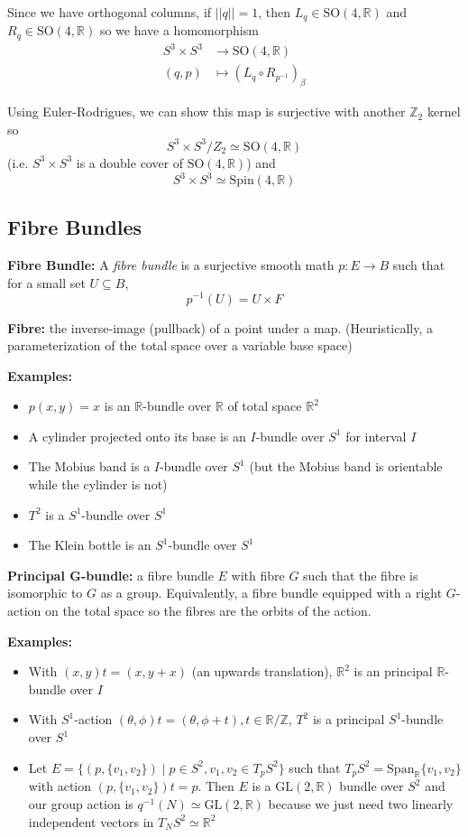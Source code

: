\documentclass[12pt]{article}
\newcommand{\R}{\mathbb{R}}
\newcommand{\Z}{\mathbb{Z}}
\newcommand{\norm}[1]{\left\vert \left\vert #1 \right\vert \right\vert}
\newcommand{\SO}{\text{SO}}
\newcommand{\GL}{\text{GL}}
\begin{document}
Since we have orthogonal columns, if $\norm{q} = 1$, then $L_q \in \SO(4, \R)$ and $R_q \in \SO(4, \R)$ so we have a homomorphism
\begin{align*}
    S^3 \times S^3 &\to \SO(4, \R)\\ 
    (q, p) &\mapsto (L_q \circ R_{p^{-1}})_{\beta}
\end{align*}

Using Euler-Rodrigues, we can show this map is surjective with another $\Z_2$ kernel so 
\[S^3 \times S^3/Z_2 \simeq \SO(4, \R)\]
(i.e. $S^3 \times S^3$ is a double cover of $\SO(4, \R)$)
and 
\[S^3 \times S^3 \simeq \text{Spin}(4, \R)\]

\subsection*{Fibre Bundles}
\textbf{Fibre Bundle:} A \emph{fibre bundle} is a surjective smooth math $p: E \to B$ such that for a small set $U \subseteq B$, 
\[p^{-1}(U) = U \times F\]

\textbf{Fibre:} the inverse-image (pullback) of a point under a map. (Heuristically, a parameterization of the total space over a variable base space)

\textbf{Examples:}
\begin{itemize}
    \item $p(x, y) = x$ is an $\R$-bundle over $\R$ of total space $\R^2$ 
    \item A cylinder projected onto its base is an $I$-bundle over $S^1$ for interval $I$
    \item The Mobius band is a $I$-bundle over $S^1$ (but the Mobius band is orientable while the cylinder is not)
    \item $T^2$ is a $S^1$-bundle over $S^1$
    \item The Klein bottle is an $S^1$-bundle over $S^1$
\end{itemize}

\textbf{Principal G-bundle:} a fibre bundle $E$ with fibre $G$ such that the fibre is isomorphic to $G$ as a group. Equivalently, a fibre bundle equipped with a right $G$-action on the total space so the fibres are the orbits of the action.

\textbf{Examples:}
\begin{itemize}
    \item With $(x, y)t = (x, y + x)$ (an upwards translation), $\R^2$ is an principal $\R$-bundle over $I$ 
    \item With $S^1$-action $(\theta, \phi)t = (\theta, \phi + t), t\in \R/\Z$, $T^2$ is a principal $S^1$-bundle over $S^1$ 
    \item Let $E = \{(p, \{v_1, v_2\}) \; | \; p\in S^2, v_1, v_2 \in T_pS^2\}$ such that $T_pS^2 = \text{Span}_{\R}\{v_1, v_2\}$ with action $(p, \{v_1, v_2\})t = p$. Then $E$ is a $\GL(2, \R)$ bundle over $S^2$ and our group action is $q^{-1}(N) \simeq \GL(2, \R)$ because we just need two linearly independent vectors in $T_N S^2 \simeq \R^2$ 
\end{itemize}
\end{document}
